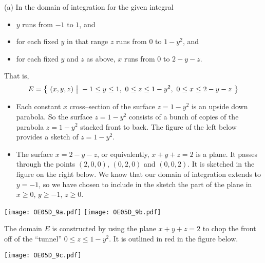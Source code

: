 \begin{solution}
(a) In the domain of integration for the given integral
\begin{itemize}
\item
$y$ runs from $-1$ to $1$, and
\item
for each fixed $y$ in that range $z$ runs from $0$ to $1-y^2$, and
\item
for each fixed $y$ and $z$ as above, $x$ runs from $0$ to $2-y-z$.
\end{itemize}
That is,
\begin{equation*}
E = \big\{ \ (x,y,z)\ \big|\ -1\le y\le 1,\ 0\le z\le 1-y^2,\ 0\le x\le 2-y-z\ \big\}
\end{equation*}
\begin{itemize}
\item
Each constant $x$ cross--section of the surface $z=1-y^2$ is an upside
down parabola. So the surface $z=1-y^2$ consists of a bunch of copies of the
parabola $z=1-y^2$ stacked front to back. The figure of the left below
provides a sketch of $z=1-y^2$.

\item
The surface $x = 2-y-z$, or equivalently, $x+y+z=2$ is a plane.
It passes through the points  $(2,0,0)$, $(0,2,0)$ and $(0,0,2)$.
It is sketched in the figure on the right below. We know that our
domain of integration extends to $y=-1$, so we have chosen to include
in the sketch the part of the plane in $x\ge 0$, $y\ge-1$, $z\ge 0$.

\end{itemize}
\begin{center}
     \texttt{[image: OE05D\_9a.pdf]}\quad
     \texttt{[image: OE05D\_9b.pdf]}
\end{center}
The domain $E$ is constructed by using the plane $x+y+z=2$
to chop the front off of the ``tunnel'' $0\le z\le 1-y^2$.
It is outlined in red in the figure below.

\begin{center}
     \texttt{[image: OE05D\_9c.pdf]}
\end{center}


\end{solution}
